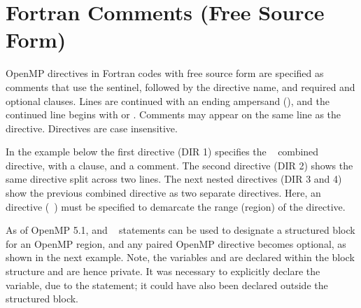 \section{Fortran Comments (Free Source Form)}
\label{sec:fortran_free_format_comments}

OpenMP directives in Fortran codes with free source form are specified as comments
that use the  sentinel, followed by the
directive name, and required and optional clauses.  Lines are continued with an ending ampersand (\code{\&}),
and the continued line begins with  or . Comments may appear on the
same line as the directive.  Directives are case insensitive.

In the example below the first directive (DIR 1) specifies the %
~ combined directive, with a  clause, and a comment.
The second directive (DIR 2) shows the same directive split across two lines. 
The next nested directives (DIR 3 and 4) show the previous combined directive as
two separate directives. 
Here, an  directive (~) must be specified to demarcate the range (region)
of the  directive. 


As of OpenMP 5.1,  and ~ statements can be used to designate 
a structured block for an OpenMP region, and any paired OpenMP  directive becomes optional,
as shown in the next example.  Note, the variables  and  are declared within the 
block structure and are hence private.
It was necessary to explicitly declare the  variable, due to the  statement; 
it could have also been declared outside the structured block.

